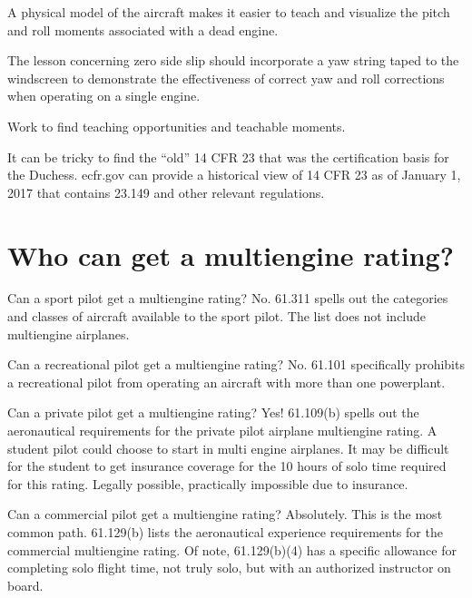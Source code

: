 A physical model of the aircraft makes it easier to teach and visualize the pitch and roll moments
associated with a dead engine.

The lesson concerning zero side slip should incorporate a yaw string taped to the windscreen to demonstrate
the effectiveness of correct yaw and roll corrections when operating on a single engine.

Work to find teaching opportunities and teachable moments.

It can be tricky to find the ``old'' 14 CFR 23 that was the certification basis for the Duchess. ecfr.gov can provide
a historical view of 14 CFR 23 as of January 1, 2017 that contains 23.149 and other relevant regulations.



\section{Who can get a multiengine rating?}

Can a sport pilot get a multiengine rating? No. 61.311 spells out the categories and classes
of aircraft available to the sport pilot. The list does not include multiengine airplanes.

Can a recreational pilot get a multiengine rating? No. 61.101 specifically prohibits
a recreational pilot from operating an aircraft with more than one powerplant.

Can a private pilot get a multiengine rating? Yes! 61.109(b) spells out the aeronautical requirements
for the private pilot airplane multiengine rating. A student pilot could choose to start in multi
engine airplanes. It may be difficult for the student to get insurance coverage for the 10 hours
of solo time required for this rating. Legally possible, practically impossible due to insurance.

Can a commercial pilot get a multiengine rating? Absolutely. This is the most common path.
61.129(b) lists the aeronautical experience requirements for the commercial multiengine rating.
Of note, 61.129(b)(4) has a specific allowance for completing solo flight time, not truly solo, but
with an authorized instructor on board.

